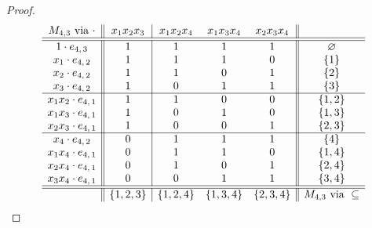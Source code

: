 \documentclass[11pt]{article}
\newcommand{\es}[2]{e_{#1,\, #2}}
\theoremstyle{plain}
\theoremstyle{definition}
\theoremstyle{remark}
\begin{document}
\begin{proof}
\begin{equation*} 
    \begin{array}{c || c | c c c || c}
        M_{4,3}\text{ via }\cdot & x_1x_2x_3 & x_1x_2x_4 & x_1x_3x_4 & x_2x_3x_4 & \\
        \hline
        \hline
        1\cdot\es{4}{3} & 1 & 1 & 1 & 1 & \varnothing \\
        x_1\cdot\es{4}{2} & 1 & 1 & 1 & 0 & \{1\} \\
        x_2\cdot\es{4}{2} & 1 & 1 & 0 & 1 & \{2\} \\
        x_3\cdot\es{4}{2} & 1 & 0 & 1 & 1 & \{3\} \\
        \hline
        x_1x_2\cdot\es{4}{1} & 1 & 1 & 0 & 0 & \{1,2\} \\
        x_1x_3\cdot\es{4}{1} & 1 & 0 & 1 & 0 & \{1,3\} \\
        x_2x_3\cdot\es{4}{1} & 1 & 0 & 0 & 1 & \{2,3\} \\
        \hline
        x_4\cdot\es{4}{2} & 0 & 1 & 1 & 1 & \{4\} \\
        x_1x_4\cdot\es{4}{1} & 0 & 1 & 1 & 0 & \{1,4\} \\
        x_2x_4\cdot\es{4}{1} & 0 & 1 & 0 & 1 & \{2,4\} \\
        x_3x_4\cdot\es{4}{1} & 0 & 0 & 1 & 1 & \{3,4\} \\
        \hline
        \hline
         & \{1,2,3\} & \{1,2,4\} & \{1,3,4\} & \{2,3,4\} &M_{4,3}\text{ via }\subseteq \\
    \end{array}
\end{equation*}

\end{proof}
\end{document}
